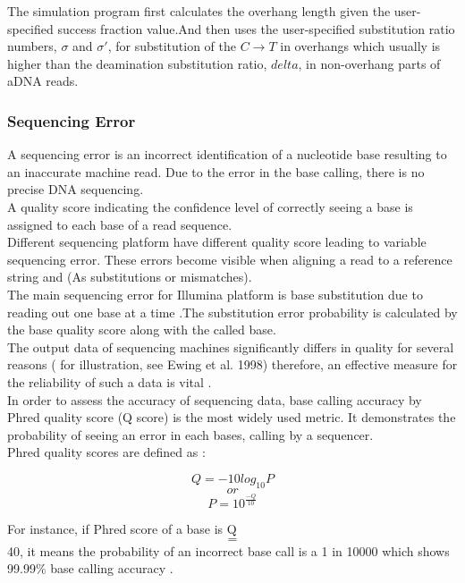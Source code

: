 \documentclass[11pt,a4paper]{report}
\begin{document}
The simulation program first calculates the overhang length given the user-specified 
success fraction value.And then uses the user-specified substitution ratio numbers,
 $ \sigma $ and $\sigma\prime $, for substitution of the $ C \rightarrow T $ in 
overhangs which usually is higher than the deamination substitution ratio, $delta$, 
in non-overhang parts of aDNA reads.

 
\subsubsection{Sequencing Error}
 

A sequencing error is an incorrect identification of a nucleotide base resulting 
to an inaccurate machine read. Due to the error in the base calling, there is no 
precise DNA sequencing. \\
A quality score indicating the confidence level of correctly seeing a base is 
assigned to each base of a read sequence.\\
Different sequencing platform have different quality score leading to variable 
sequencing error. These errors become visible when aligning a read to a reference 
string and (As substitutions or mismatches).\\
The main sequencing error for Illumina platform is base substitution due to 
reading out one base at a time \cite{art}.The substitution error probability is 
calculated by the base quality score along with the called base.\\


The output data of sequencing machines significantly differs in quality for 
several reasons ( for illustration, see Ewing et al. 1998) therefore, an effective 
measure for the reliability of such a data is vital \cite{phred1}.\\

In order to assess the accuracy of sequencing data, base calling accuracy by Phred 
quality score (Q score) is the most widely used metric. It demonstrates the probability 
of seeing an error in each bases, calling by a sequencer.\\

Phred quality scores are defined as \cite{phred2}:

$$ Q = -10  log_{10}P   $$
$$  or $$
$$ P = 10 ^ { \frac{-Q}{ 10 } } $$

For instance, if Phred score of a base is Q$$=$$40, it means the probability of an 
incorrect base call is a 1 in 10000 which shows 99.99\% base calling accuracy 
\cite{IlluminaPhred}. \\  
\end{document}
